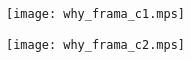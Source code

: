 \documentclass{article}
\begin{document}
\texttt{[image: why\_frama\_c1.mps]}

\texttt{[image: why\_frama\_c2.mps]}
\end{document}
